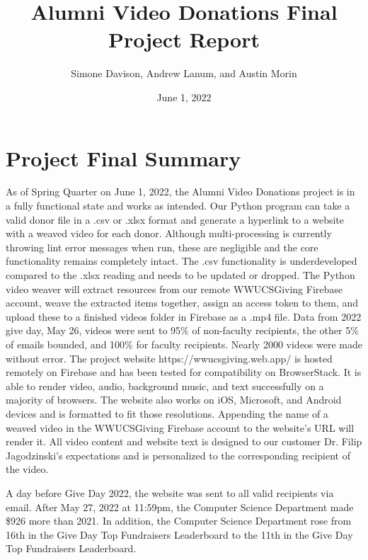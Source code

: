 \documentclass{article}
\title{Alumni Video Donations Final Project Report}
\author{Simone Davison, Andrew Lanum, and Austin Morin }
\date{June 1, 2022}
\begin{document}
\maketitle

\section{Project Final Summary}

As of Spring Quarter on June 1, 2022, the Alumni Video Donations project is in a fully functional state and 
works as intended. Our Python program can take a valid donor file in a .csv or .xlsx format and generate a 
hyperlink to a website with a weaved video for each donor. Although multi-processing is currently throwing 
lint error messages when run, these are negligible and the core functionality remains completely intact. 
The .csv functionality is underdeveloped compared to the .xlsx reading and needs to be updated or dropped.
The Python video weaver will extract resources from our remote WWUCSGiving Firebase account, weave the 
extracted items together, assign an access token to them, and upload these to a finished videos folder in 
Firebase as a .mp4 file. Data from 2022 give day, May 26, videos were sent to 95\% of non-faculty recipients, the other 5\% of emails bounded, and 100\% for faculty recipients. 
Nearly 2000 videos were made without error. The project website https://wwucsgiving.web.app/ is hosted remotely 
on Firebase and has been tested for compatibility on BrowserStack. It is able to render video, audio, background 
music, and text successfully on a majority of browsers. The website also works on iOS, Microsoft, and Android devices 
and is formatted to fit those resolutions. Appending the name of a weaved video in the WWUCSGiving Firebase account 
to the website's URL will render it. All video content and website text is designed to our customer Dr. Filip 
Jagodzinski's expectations and is personalized to the corresponding recipient of the video.

A day before Give Day 2022, the website was sent to all valid recipients via email. After May 27, 2022 at 11:59pm, 
the Computer Science Department made \$926 more than 2021. In addition, the Computer Science Department rose from 
16th in the Give Day Top Fundraisers Leaderboard to the 11th in the Give Day Top Fundraisers Leaderboard.
\end{document}
